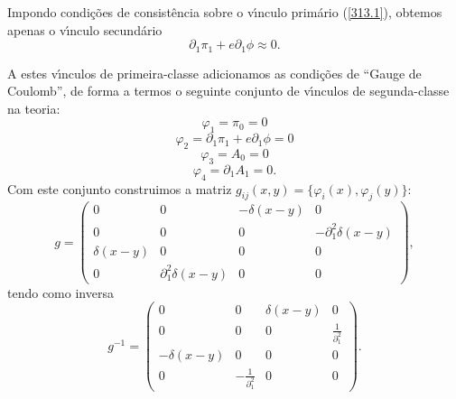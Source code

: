 \documentclass[a4paper,thmsa,12pt]{report}
\begin{document}
Impondo condi\c{c}\~{o}es de consist\^{e}ncia sobre o v\'{\i}nculo
prim\'{a}rio (\ref{313.1}), obtemos apenas o v\'{\i}nculo secund\'{a}rio 
\begin{equation}
\partial _{1}\pi _{1}+e\partial _{1}\phi \approx 0.  \label{315}
\end{equation}

A estes v\'{\i}nculos de primeira-classe adicionamos as condi\c{c}\~{o}es de
``Gauge de Coulomb'', de forma a termos o seguinte conjunto de v\'{\i}nculos
de segunda-classe na teoria: 
\begin{equation}
\varphi _{1}=\pi _{0}=0  \label{316.a}
\end{equation}
\begin{equation}
\varphi _{2}=\partial _{1}\pi _{1}+e\partial _{1}\phi =0  \label{316.b}
\end{equation}
\begin{equation}
\varphi _{3}=A_{0}=0  \label{316.c}
\end{equation}
\begin{equation}
\varphi _{4}=\partial _{1}A_{1}=0.  \label{316.d}
\end{equation}
Com este conjunto construimos a matriz $g_{ij}\left( x,y\right) =\{\varphi
_{i}(x),\varphi _{j}(y)\}:$%
\begin{equation}
g=\left( 
\begin{array}{cccc}
0 & 0 & -\delta (x-y) & 0 \\ 
0 & 0 & 0 & -\partial _{1}^{2}\delta (x-y) \\ 
\delta (x-y) & 0 & 0 & 0 \\ 
0 & \partial _{1}^{2}\delta (x-y) & 0 & 0
\end{array}
\right) ,  \label{317}
\end{equation}
tendo como inversa 
\begin{equation}
g^{-1}=\left( 
\begin{array}{cccc}
0 & 0 & \delta (x-y) & 0 \\ 
0 & 0 & 0 & \frac{1}{\partial _{1}^{2}} \\ 
-\delta (x-y) & 0 & 0 & 0 \\ 
0 & -\frac{1}{\partial _{1}^{2}} & 0 & 0
\end{array}
\right) .  \label{318}
\end{equation}
\end{document}

